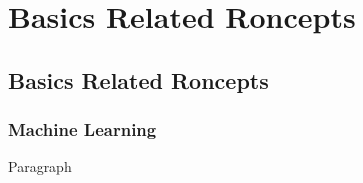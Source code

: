 
\chapter{Basics Related Roncepts} %

\label{c3} %

\section{Basics Related Roncepts}
\subsection{Machine Learning}

\par Paragraph



\clearpage
\afterpage{
    \ifodd\value{page}
        \thispagestyle{empty}
        \mbox{}
        \newpage
    \fi
}